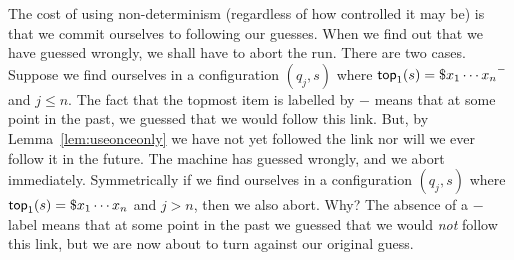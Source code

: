 The cost of using non-determinism (regardless of how controlled it may
be) is that we commit ourselves to following our guesses. When we find
out that we have guessed wrongly, we shall have to abort the
run. There are two cases. Suppose we find ourselves in a configuration
$(q_j,s)$ where ${\sf top}_1(s) = {\$ x_1 \cdots x_n}^{-}$ and $j \leq
n$. The fact that the topmost item is labelled by $-$ means that at
some point in the past, we guessed that we would follow this link.
But, by Lemma~\ref{lem:useonceonly} we have not yet followed the
link nor will we ever follow it in the future.
The machine has guessed wrongly, and we abort immediately.
Symmetrically if we find ourselves in a configuration $(q_j,s)$
where ${\sf top}_1(s) = \$ x_1 \cdots x_n$ and $j > n$, then we also
abort. Why? The absence of a $-$ label means that at some point in
the past we guessed that we would \emph{not} follow this link, but
we are now about to turn against our original guess.

%

